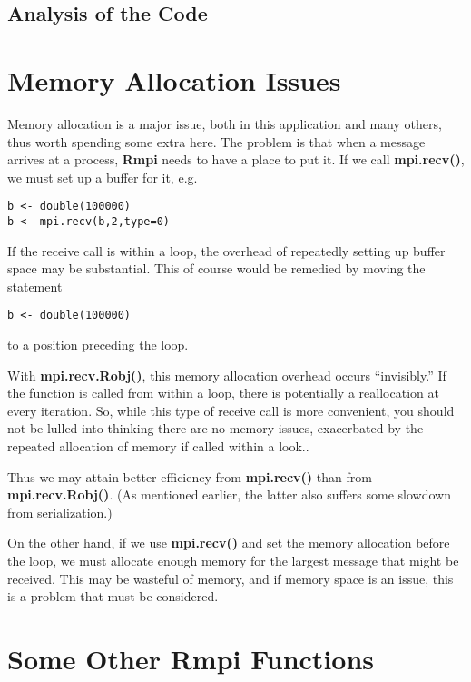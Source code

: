 \subsection{Analysis of the Code}
\label{qscode}

\section{Memory Allocation Issues}
\label{memallocissues}

Memory allocation is a major issue, both in this application and
many others, thus worth spending some extra here.  The problem is that
when a message arrives at a process, {\bf Rmpi} needs to have a place to
put it.  If we call {\bf mpi.recv()}, we must set up a buffer for it,
e.g.

\begin{lstlisting}
b <- double(100000)
b <- mpi.recv(b,2,type=0)
\end{lstlisting}

If the receive call is within a loop, the overhead of repeatedly setting
up buffer space may be substantial.  This of course would be remedied by
moving the statement

\begin{lstlisting}
b <- double(100000)
\end{lstlisting}

to a position preceding the loop.

With {\bf mpi.recv.Robj()}, this memory allocation overhead occurs
``invisibly.''  If the function is called from within a loop, there
is potentially a reallocation at every iteration.  So, while this type
of receive call is more convenient, you should not be lulled into
thinking there are no memory issues, exacerbated by the repeated
allocation of memory if called within a look..

Thus we may attain better efficiency from {\bf mpi.recv()} than from {\bf
mpi.recv.Robj()}.  (As mentioned earlier, the latter also suffers some
slowdown from serialization.)

On the other hand, if we use {\bf mpi.recv()} and set the memory
allocation before the loop, we must allocate enough memory for the
largest message that might be received.  This may be wasteful of memory,
and if memory space is an issue, this is a problem that must be
considered.

\section{Some Other Rmpi Functions}

